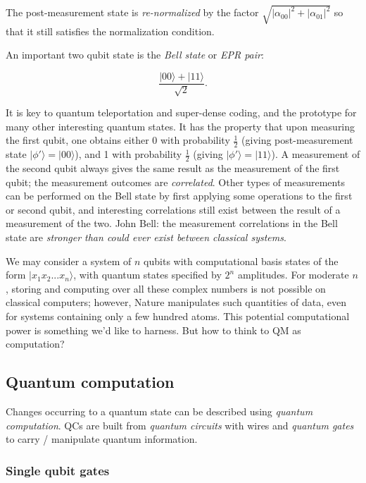 \documentclass{article}
\numberwithin{equation}{section}
\newcommand{\bracket}[1]{|#1\rangle}
\begin{document}
The post-measurement state is \textit{re-normalized} by the factor $\sqrt{|\alpha_{00}|^2 + |\alpha_{01}|^2}$ so that it still satisfies the normalization condition.

An important two qubit state is the \textit{Bell state} or \textit{EPR pair}:

\begin{equation} \label{eq:1.7}
\frac{\bracket{00} + \bracket{11}}{\sqrt{2}}.
\end{equation}

It is key to quantum teleportation and super-dense coding, and the prototype for many other interesting quantum states. It has the property that upon measuring the first qubit, one obtains either 0 with probability $\frac{1}{2}$ (giving post-measurement state $\bracket{\phi'} = \bracket{00}$), and 1 with probability $\frac{1}{2}$ (giving $\bracket{\phi'} = \bracket{11}$). A measurement of the second qubit always gives the same result as the measurement of the first qubit; the measurement outcomes are \textit{correlated}. Other types of measurements can be performed on the Bell state by first applying some operations to the first or second qubit, and interesting correlations still exist between the result of a measurement of the two. John Bell: the measurement correlations in the Bell state are \textit{stronger than could ever exist between classical systems}.

We may consider a system of $n$ qubits with computational basis states of the form $\bracket{x_1 x_2 ... x_n}$, with quantum states specified by $2^n$ amplitudes. For moderate $n$, storing and computing over all these complex numbers is not possible on classical computers; however, Nature manipulates such quantities of data, even for systems containing only a few hundred atoms. This potential computational power is something we'd like to harness. But how to think to QM as computation?

\subsection{Quantum computation}

Changes occurring to a quantum state can be described using \textit{quantum computation}. QCs are built from \textit{quantum circuits} with wires and \textit{quantum gates} to carry / manipulate quantum information.

\subsubsection{Single qubit gates}
\end{document}
